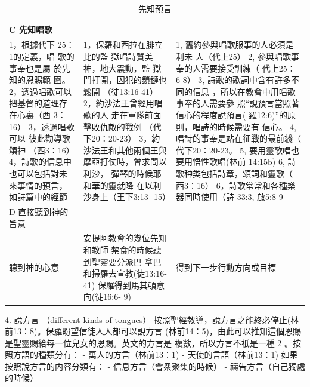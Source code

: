 \begin{table}[H]
\begin{tabular}{p{15.145em}|p{15.785em}|p{16.5em}}
C 先知唱歌&&\\    \midrule
1，根據代下
25：1的定義，唱
歌的事奉也是屬
於先知的恩賜範
圍。
2，透過唱歌可以
把基督的道理存
在心裏（西
3：16）
3，透過唱歌可以
彼此勸導歌頌神
（西3：16）
4，詩歌的信息中
也可以包括對未
來事情的預言，
如詩篇中的經節&

1，保羅和西拉在腓立比的監
獄唱詩贊美神，地大震動，監
獄門打開，囚犯的鎖鏈也鬆開
（徒13:16-41）
2，約沙法王曾經用唱歌的人
走在軍隊前面擊敗仇敵的戰例
（代下20：20-23）
3，約沙法王和其他兩個王與
摩亞打仗時，曾求問以利沙，
彈琴的時候耶和華的靈就降
在以利沙身上（王下3:13-
15）&

1, 舊約參與唱歌服事的人必須是利未
人（代上25）
2, 參與唱歌事奉的人需要接受訓練（
代上25：6-8）
3, 詩歌的歌詞中含有許多不同的信息
，所以在教會中用唱歌事奉的人需要參
照“說預言當照著信心的程度說預言(
羅12:6)”的原則，唱詩的時候需要有
信心。
4, 唱詩的事奉是站在征戰的最前綫（
代下20：20-23。
5, 要用靈歌唱也要用悟性歌唱(林前
14:15b)
6, 詩歌种类包括詩章，頌詞和靈歌（
西3：16）
6，詩歌常常和各種樂器同時使用（詩
33:3, 啟5:8-9\\    \midrule

D 直接聽到神的旨意&&\\    \midrule
聼到神的心意&安提阿教會的幾位先知和教師
禁食的時候聽到聖靈要分派巴
拿巴和掃羅去宣教(徒13:16-
41)
保羅得到馬其頓意向(徒16:6-
9)&
得到下一步行動方向或目標\\    \midrule
\end{tabular}%
\caption{先知預言}
\label{tab:addlabel}%
\end{table}%


4. 說方言 （different kinds of tongues）
按照聖經教導，說方言之能終必停止(林前13：8)。保羅盼望信徒人人都可以說方言
(林前14：5)，由此可以推知這個恩賜是聖靈賜給每一位兒女的恩賜。英文的方言是
複數，所以方言不衹是一種 2 。按照方語的種類分有：
- 萬人的方言（林前13：1)
- 天使的言語（林前13：1)
如果按照說方言的内容分類有：
- 信息方言（會衆聚集的時候）
- 禱告方言（自己獨處的時候）


